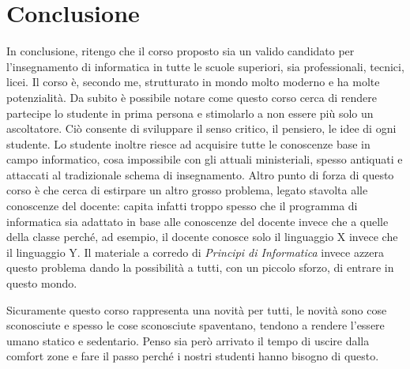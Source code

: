 \documentclass[11pt,a4paper]{article}
\begin{document}
\section{Conclusione}

In conclusione, ritengo che il corso proposto sia un valido candidato
per l'insegnamento di informatica in tutte le scuole superiori, sia 
professionali, tecnici, licei. Il corso è, secondo me, strutturato
in mondo molto moderno e ha molte potenzialità. Da subito è possibile
notare come questo corso cerca di rendere partecipe lo studente in
prima persona e stimolarlo a non essere più solo un ascoltatore. 
Ciò consente di sviluppare il senso critico, il pensiero, le idee 
di ogni studente.
Lo studente inoltre riesce ad acquisire tutte le conoscenze base in
campo informatico, cosa impossibile con gli attuali ministeriali,
spesso antiquati e attaccati al tradizionale schema di insegnamento.
Altro punto di forza di questo corso è che cerca di estirpare un 
altro grosso problema, legato stavolta alle conoscenze del docente: 
capita infatti troppo spesso che il programma di informatica sia
adattato in base alle conoscenze del docente invece che a quelle 
della classe perché, ad esempio, il docente conosce solo il 
linguaggio X invece che il linguaggio Y. Il materiale a corredo di
\emph{Principi di Informatica} invece azzera questo problema dando 
la possibilità a tutti, con un piccolo sforzo, di entrare in questo
mondo.

Sicuramente questo corso rappresenta una novità per tutti, le novità sono cose sconosciute e spesso le cose sconosciute spaventano, tendono a rendere l'essere umano statico e sedentario. Penso sia però arrivato il tempo di uscire dalla comfort zone e fare il passo perché i nostri studenti hanno bisogno di questo.
\end{document}
